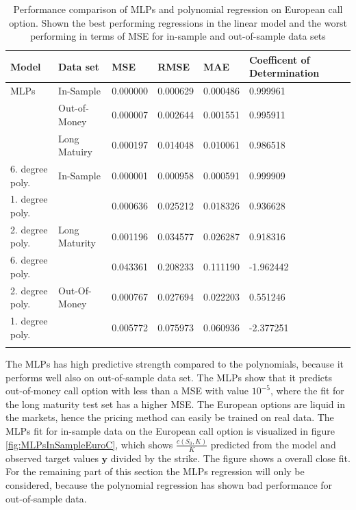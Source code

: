 \begin{table}[th]
\caption{Performance comparison of MLPs and polynomial regression on European call option. Shown the best performing regressions in the linear model and the worst performing in terms of MSE for in-sample and out-of-sample data sets}
\label{tab:ComparePolyWithMLPS}
\centering
\begin{tabular}{l l l l l l l }
\toprule
\textbf{Model} & \textbf{Data set} & \textbf{MSE} & \textbf{RMSE} & \textbf{MAE} & \textbf{Coefficent of Determination} \\
\midrule
MLPs & In-Sample & 0.000000 & 0.000629 & 0.000486 & 0.999961\\
& Out-of-Money & 0.000007 & 0.002644 & 0.001551 & 0.995911\\
& Long Matuiry & 0.000197 & 0.014048 & 0.010061 & 0.986518\\
6. degree poly. & In-Sample & 0.000001 & 0.000958 & 0.000591 & 0.999909\\
1. degree poly. &  & 0.000636 & 0.025212 & 0.018326 & 0.936628\\
2. degree poly. & Long Maturity & 0.001196 & 0.034577 & 0.026287 & 0.918316\\
6. degree poly. &  & 0.043361 & 0.208233 & 0.111190 & -1.962442\\
2. degree poly. & Out-Of-Money & 0.000767 & 0.027694 & 0.022203 & 0.551246\\
1. degree poly. &  & 0.005772 & 0.075973 & 0.060936 & -2.377251\\
\bottomrule\\
\end{tabular}
\end{table}

The MLPs has high predictive strength compared to the polynomials, because it performs well also on out-of-sample data set. The MLPs show that it predicts out-of-money call option with less than a MSE with value $10^{-5}$, where the fit for the long maturity test set has a higher MSE. The European options are liquid in the markets, hence the pricing method can easily be trained on real data. The MLPs fit for in-sample data on the European call option is visualized in figure \ref{fig:MLPsInSampleEuroC}, which shows $\frac{c(S_0,K)}{K}$ predicted from the model and observed target values $\bm{y}$ divided by the strike. The figure shows a overall close fit. For the remaining part of this section the MLPs regression will only be considered, because the polynomial regression has shown bad performance for out-of-sample data.

